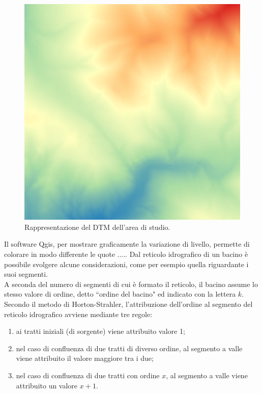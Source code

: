 \begin{figure}[H]\centering
    \includegraphics[scale=.50]{immagini/dtm_qgis.PNG}
    \caption{Rappresentazione del DTM dell'area di studio.}
    \label{dtm_qgis}
\end{figure}
Il software Qgis, per mostrare graficamente la variazione di livello, permette di colorare in modo differente le quote .....
Dal reticolo idrografico di un bacino è possibile svolgere alcune considerazioni, come per esempio quella riguardante i suoi segmenti.\\
A seconda del numero di segmenti di cui è formato il reticolo, il bacino assume lo stesso valore di ordine, detto ``ordine del bacino" ed indicato con la lettera $k$.\\
Secondo il metodo di Horton-Strahler, l'attribuzione dell'ordine al segmento del reticolo idrografico avviene mediante tre regole: 
\begin{enumerate}
    \item ai tratti iniziali (di sorgente) viene attribuito valore 1;
    \item nel caso di confluenza di due tratti di diverso ordine, al segmento a valle viene attribuito il valore maggiore tra i due;
    \item nel caso di confluenza di due tratti con ordine $x$, al segmento a valle viene attribuito un valore $x+1$.
\end{enumerate} 
